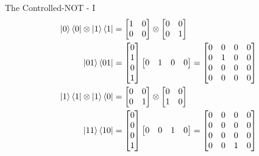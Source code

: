 \documentclass{beamer}
\begin{document}
\begin{frame}{The Controlled-NOT - I}
  {\tiny
    \begin{align*}
      \ket0\bra0 \otimes \ket1\bra1 &= \begin{bmatrix} 1 & 0 \\ 0 & 0 \end{bmatrix} \otimes \begin{bmatrix} 0 & 0 \\ 0 & 1 \end{bmatrix} \\
      \ket{01}\bra{01}
      &= \begin{bmatrix} 0 \\ 1 \\ 0 \\ 1 \end{bmatrix} \begin{bmatrix} 0 & 1 & 0 & 0\end{bmatrix} 
       = \begin{bmatrix} 0 & 0 & 0 & 0 \\ 0 & 1 & 0 & 0 \\ 0 & 0 & 0 & 0 \\ 0 & 0 & 0 & 0 \end{bmatrix} \\
      \ket1\bra1 \otimes \ket1\bra0 &= \begin{bmatrix} 0 & 0 \\ 0 & 1 \end{bmatrix} \otimes \begin{bmatrix} 0 & 0 \\ 1 & 0 \end{bmatrix} \\
      \ket{11}\bra{10}
      &= \begin{bmatrix} 0 \\ 0 \\ 0 \\ 1 \end{bmatrix} \begin{bmatrix} 0 & 0 & 1 & 0\end{bmatrix} 
       = \begin{bmatrix} 0 & 0 & 0 & 0 \\ 0 & 0 & 0 & 0 \\ 0 & 0 & 0 & 0 \\ 0 & 0 & 1 & 0 \end{bmatrix} \\
    \end{align*}
    \begin{align*}

\end{align*}}
\end{frame}
\end{document}
